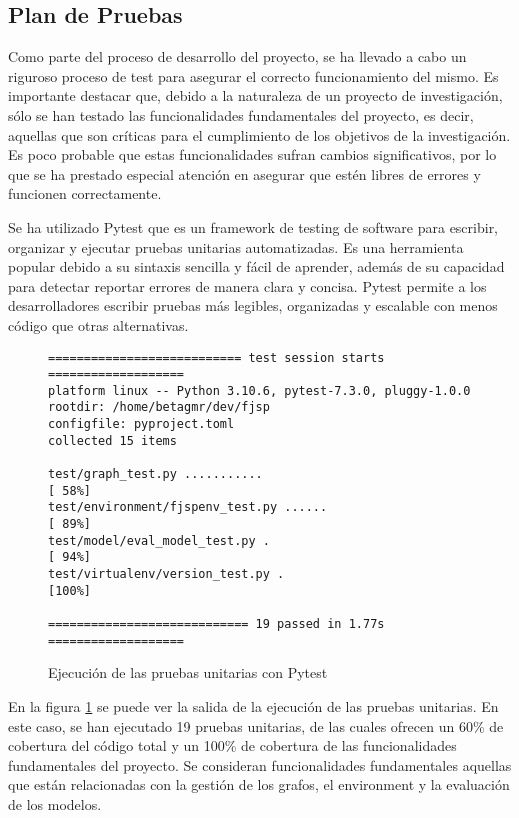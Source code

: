 \subsection{Plan de Pruebas}
Como parte del proceso de desarrollo del proyecto, se ha llevado a cabo un riguroso 
proceso de test para asegurar el correcto funcionamiento del mismo. Es importante 
destacar que, debido a la naturaleza de un proyecto de investigación, sólo se han 
testado las funcionalidades fundamentales del proyecto, es decir, aquellas que 
son críticas para el cumplimiento de los objetivos de la investigación. Es poco 
probable que estas funcionalidades sufran cambios significativos, por lo que se ha 
prestado especial atención en asegurar que estén libres de errores y funcionen correctamente.\medskip

Se ha utilizado Pytest que es un framework de testing de software para escribir, 
organizar y ejecutar pruebas unitarias automatizadas. Es una herramienta popular 
debido a su sintaxis sencilla y fácil de aprender, además de su capacidad para detectar 
reportar errores de manera clara y concisa. Pytest permite a los desarrolladores 
escribir pruebas más legibles, organizadas y escalable con menos código 
que otras alternativas. 

\begin{figure}[ht]
    \label{fig:pytest-output}
    \begin{lstlisting}
=========================== test session starts ===================
platform linux -- Python 3.10.6, pytest-7.3.0, pluggy-1.0.0
rootdir: /home/betagmr/dev/fjsp
configfile: pyproject.toml
collected 15 items                                                         

test/graph_test.py ...........                               [ 58%]
test/environment/fjspenv_test.py ......                      [ 89%]
test/model/eval_model_test.py .                              [ 94%]
test/virtualenv/version_test.py .                            [100%]

============================ 19 passed in 1.77s =================== 
    \end{lstlisting}
    \caption{Ejecución de las pruebas unitarias con Pytest}
\end{figure}

En la figura \ref{fig:pytest-output} se puede ver la salida de la ejecución de las
pruebas unitarias. En este caso, se han ejecutado 19 pruebas unitarias, de las cuales
ofrecen un 60\% de cobertura del código total y un 100\% de cobertura de las funcionalidades
fundamentales del proyecto. Se consideran funcionalidades fundamentales aquellas que
están relacionadas con la gestión de los grafos, el environment y la evaluación de los
modelos.
